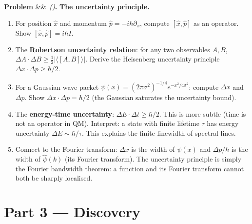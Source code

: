\documentclass[12pt,a4paper]{article}
\newcounter{problem}
\newenvironment{problem}[1][]{\refstepcounter{problem}\par\vspace{6pt}\noindent\textbf{\color{MidBlue}Problem \theproblem}\ifx&#1&\else\ \textit{(#1)}\fi\textbf{.}\enskip}{\par\vspace{4pt}}
\begin{document}
\begin{problem}
\label{prob:uncertainty}
\textbf{The uncertainty principle.}
\begin{enumerate}[label=(\alph*),topsep=2pt]
  \item For position $\hat{x}$ and momentum $\hat{p}=-i\hbar\partial_x$, compute $[\hat{x},\hat{p}]$ as an operator. Show $[\hat{x},\hat{p}]=i\hbar I$.
  \item The \textbf{Robertson uncertainty relation}: for any two observables $A,B$, $\Delta A\cdot\Delta B \geq \frac{1}{2}|\langle[A,B]\rangle|$. Derive the Heisenberg uncertainty principle $\Delta x\cdot\Delta p \geq \hbar/2$.
  \item For a Gaussian wave packet $\psi(x) = (2\pi\sigma^2)^{-1/4}e^{-x^2/4\sigma^2}$: compute $\Delta x$ and $\Delta p$. Show $\Delta x\cdot\Delta p = \hbar/2$ (the Gaussian saturates the uncertainty bound).
  \item The \textbf{energy-time uncertainty}: $\Delta E\cdot\Delta t \geq \hbar/2$. This is more subtle (time is not an operator in QM). Interpret: a state with finite lifetime $\tau$ has energy uncertainty $\Delta E \sim \hbar/\tau$. This explains the finite linewidth of spectral lines.
  \item Connect to the Fourier transform: $\Delta x$ is the width of $\psi(x)$ and $\Delta p/\hbar$ is the width of $\hat\psi(k)$ (its Fourier transform). The uncertainty principle is simply the Fourier bandwidth theorem: a function and its Fourier transform cannot both be sharply localised.
\end{enumerate}
\end{problem}

\section{Part 3 \texorpdfstring{---}{--} Discovery}
\end{document}
